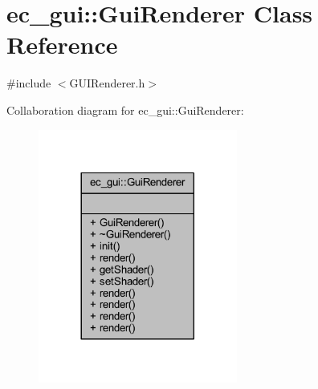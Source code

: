 \hypertarget{classec__gui_1_1_gui_renderer}{}\section{ec\+\_\+gui\+:\+:Gui\+Renderer Class Reference}
\label{classec__gui_1_1_gui_renderer}


{\ttfamily \#include $<$G\+U\+I\+Renderer.\+h$>$}



Collaboration diagram for ec\+\_\+gui\+:\+:Gui\+Renderer\+:\nopagebreak
\begin{figure}[H]
\begin{center}
\leavevmode
\includegraphics[width=185pt]{classec__gui_1_1_gui_renderer__coll__graph}
\end{center}
\end{figure}
